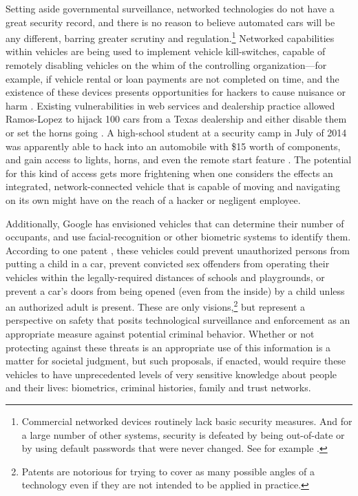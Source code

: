 Setting aside governmental surveillance, networked technologies do not
have a great security record, 
and there is no reason to believe automated cars will be any
different, barring greater scrutiny and
regulation.\footnote{Commercial networked devices routinely lack basic
security measures. And for a large number of other systems, security
is defeated by being out-of-date or by using default passwords that
were never changed. See for example \cite{zetter}.}
Networked capabilities within vehicles are being used to
implement vehicle kill-switches, capable of remotely disabling
vehicles on the whim of the controlling organization---for example, if
vehicle rental or loan payments are not completed on time, and the existence of these devices
presents opportunities for hackers to cause nuisance or
harm \cite{goodman}.
Existing vulnerabilities in web services and dealership practice
allowed Ramos-Lopez to hijack 100 cars from a Texas dealership and
either disable them or set
the horns
going \cite{poulsenHacker}. A
high-school student at a security camp in July of 2014 was apparently
able to hack into an automobile with \$15 worth of components, and
gain access to lights, horns, and even the remote start
feature \cite{bigelow14}.
The
potential for this kind of access gets more frightening when one
considers the effects an integrated, network-connected vehicle that is capable of
moving and navigating on its own might have on the reach of a hacker or negligent employee.

Additionally, Google has envisioned vehicles that can determine their number of
occupants, and use facial-recognition or other biometric systems to
identify them. According to one patent \cite{predictPatent}, these vehicles could prevent
unauthorized persons from putting a child in a car, prevent convicted
sex offenders from operating their vehicles within the
legally-required distances of schools and playgrounds, or prevent a
car's doors from being opened (even from the inside) by a child unless
an authorized adult is present. These are only visions,\footnote{Patents
are notorious for trying to cover as many possible angles of a
technology even if they are not intended to be applied in practice.} 
but represent a perspective on safety 
that posits technological surveillance and enforcement as an
appropriate measure against potential criminal behavior. Whether or not protecting
against these threats is an appropriate use of this information is a
matter for societal judgment, but such proposals, if enacted, would
require these vehicles to have unprecedented levels of very sensitive
knowledge about people and their lives: biometrics, criminal
histories, family and trust networks. 

